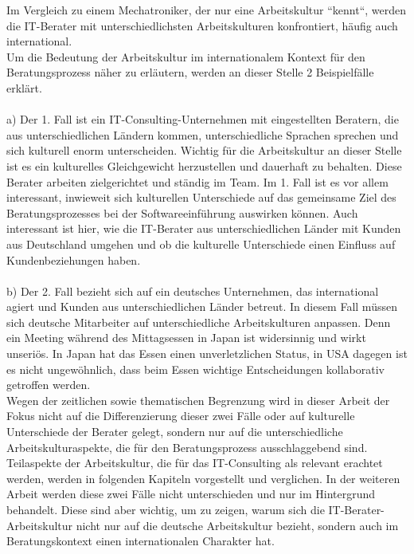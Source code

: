Im Vergleich zu einem Mechatroniker, der nur eine Arbeitskultur ``kennt``, werden die IT-Berater mit unterschiedlichsten Arbeitskulturen konfrontiert, häufig auch international.\\
Um die Bedeutung der Arbeitskultur im internationalem Kontext für den Beratungsprozess näher zu erläutern, werden an dieser Stelle 2 Beispielfälle erklärt.\\
	 \\
	 a) Der 1. Fall ist ein IT-Consulting-Unternehmen mit eingestellten Beratern, die aus unterschiedlichen Ländern kommen, unterschiedliche Sprachen sprechen und sich kulturell enorm unterscheiden. Wichtig für die Arbeitskultur an dieser Stelle ist es ein kulturelles Gleichgewicht herzustellen und dauerhaft zu behalten. Diese Berater arbeiten zielgerichtet und ständig im Team. Im 1. Fall ist es vor allem  interessant, inwieweit sich kulturellen Unterschiede auf das gemeinsame Ziel des Beratungsprozesses bei der Softwareeinführung auswirken können. Auch interessant ist hier, wie die IT-Berater aus unterschiedlichen Länder mit Kunden aus Deutschland umgehen und ob die kulturelle Unterschiede einen Einfluss auf Kundenbeziehungen haben. \\
	 \\
	 b) Der 2. Fall bezieht sich auf ein deutsches Unternehmen, das international agiert und Kunden aus unterschiedlichen Länder betreut. In diesem Fall müssen sich deutsche Mitarbeiter auf unterschiedliche Arbeitskulturen anpassen. Denn ein Meeting während des Mittagsessen in Japan ist widersinnig und wirkt unseriös. In Japan hat das Essen einen unverletzlichen Status, in USA dagegen ist es nicht ungewöhnlich, dass beim Essen wichtige Entscheidungen kollaborativ getroffen werden.\\
	Wegen der zeitlichen sowie thematischen Begrenzung wird in dieser Arbeit der Fokus nicht auf die Differenzierung dieser zwei Fälle oder auf kulturelle Unterschiede der Berater gelegt, sondern nur auf die unterschiedliche Arbeitskulturaspekte, die für den Beratungsprozess ausschlaggebend sind. Teilaspekte der Arbeitskultur, die für das IT-Consulting als relevant erachtet werden, werden in folgenden Kapiteln vorgestellt und verglichen. In der weiteren Arbeit werden diese zwei Fälle nicht unterschieden und nur im Hintergrund behandelt.
	Diese sind aber wichtig, um zu zeigen, warum sich die IT-Berater-Arbeitskultur nicht nur auf die deutsche Arbeitskultur bezieht, sondern auch im Beratungskontext einen internationalen Charakter hat.\\
	\\
